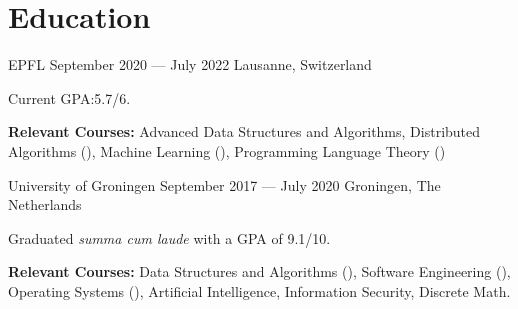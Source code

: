 \section*{Education}

\begin{cventries}
{EPFL} %
{September 2020 --- July 2022} %
{Lausanne, Switzerland} %
{%
  \begin{cvitems}
    \item Current GPA:\@ 5.7/6.
    \item \textbf{Relevant Courses:} Advanced Data Structures and Algorithms, Distributed Algorithms (), Machine Learning (), Programming Language Theory ()
  \end{cvitems}
}
{University of Groningen}  %
{September 2017 --- July 2020} %
{Groningen, The Netherlands} %
{%
  \begin{cvitems}
    \item Graduated \textit{summa cum laude} with a GPA of 9.1/10.
    \item \textbf{Relevant Courses:} Data Structures and Algorithms (), Software Engineering (), Operating Systems (), Artificial Intelligence, Information Security, Discrete Math.
  \end{cvitems}
}
\end{cventries}
